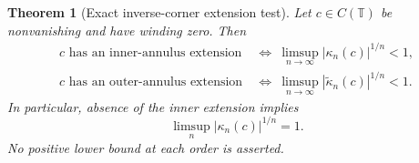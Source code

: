\documentclass[11pt]{article}
\newtheorem{theorem}{Theorem}[section]
\theoremstyle{definition}
\newcommand{\T}{\mathbb T}
\begin{document}
\begin{theorem}[Exact inverse-corner extension test]\label{thm:inverse-test}
Let $c\in C(\T)$ be nonvanishing and have winding zero. Then
\begin{align}
 c\text{ has an inner-annulus extension}
 &\ \Longleftrightarrow\ 
 \limsup_{n\to\infty}|\kappa_n(c)|^{1/n}<1,\label{eq:inner-corner}\\
 c\text{ has an outer-annulus extension}
 &\ \Longleftrightarrow\ 
 \limsup_{n\to\infty}|\widetilde\kappa_n(c)|^{1/n}<1.\label{eq:outer-corner}
\end{align}
In particular, absence of the inner extension implies
\begin{equation}
 \limsup_n|\kappa_n(c)|^{1/n}=1.
 \label{eq:corner-limsup}
\end{equation}
No positive lower bound at each order is asserted.
\end{theorem}
\end{document}
